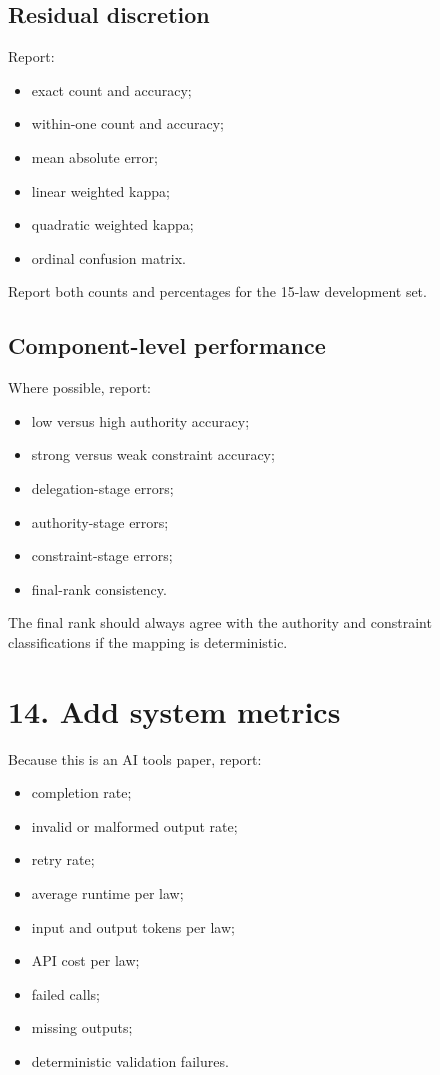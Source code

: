 \documentclass[11pt]{article}
\begin{document}
\subsection*{Residual discretion}

Report:

\begin{itemize}
    \item exact count and accuracy;
    \item within-one count and accuracy;
    \item mean absolute error;
    \item linear weighted kappa;
    \item quadratic weighted kappa;
    \item ordinal confusion matrix.
\end{itemize}

Report both counts and percentages for the 15-law development set.

\subsection*{Component-level performance}

Where possible, report:

\begin{itemize}
    \item low versus high authority accuracy;
    \item strong versus weak constraint accuracy;
    \item delegation-stage errors;
    \item authority-stage errors;
    \item constraint-stage errors;
    \item final-rank consistency.
\end{itemize}

The final rank should always agree with the authority and constraint classifications if the mapping is deterministic.

\section*{14. Add system metrics}

Because this is an AI tools paper, report:

\begin{itemize}
    \item completion rate;
    \item invalid or malformed output rate;
    \item retry rate;
    \item average runtime per law;
    \item input and output tokens per law;
    \item API cost per law;
    \item failed calls;
    \item missing outputs;
    \item deterministic validation failures.
\end{itemize}
\end{document}

